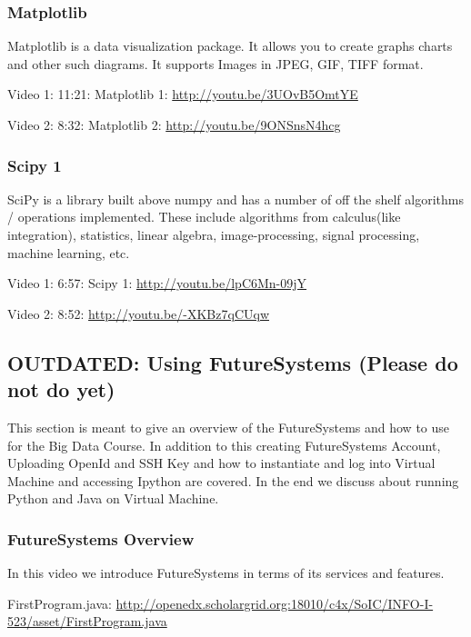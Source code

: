 \subsubsection{Matplotlib}\label{matplotlib}

Matplotlib is a data visualization package. It allows you to create
graphs charts and other such diagrams. It supports Images in JPEG, GIF,
TIFF format.

Video 1: 11:21: Matplotlib 1: \url{http://youtu.be/3UOvB5OmtYE}

Video 2: 8:32: Matplotlib 2: \url{http://youtu.be/9ONSnsN4hcg}

\subsubsection{Scipy 1}\label{scipy-1}

SciPy is a library built above numpy and has a number of off the shelf
algorithms / operations implemented. These include algorithms from
calculus(like integration), statistics, linear algebra,
image-processing, signal processing, machine learning, etc.

Video 1: 6:57: Scipy 1: \url{http://youtu.be/lpC6Mn-09jY}

Video 2: 8:52: \url{http://youtu.be/-XKBz7qCUqw}

\subsection{OUTDATED: Using FutureSystems (Please do not do
yet)}\label{outdated-using-futuresystems-please-do-not-do-yet}

This section is meant to give an overview of the FutureSystems and how
to use for the Big Data Course. In addition to this creating
FutureSystems Account, Uploading OpenId and SSH Key and how to
instantiate and log into Virtual Machine and accessing Ipython are
covered. In the end we discuss about running Python and Java on Virtual
Machine.

\subsubsection{FutureSystems Overview}\label{futuresystems-overview}

In this video we introduce FutureSystems in terms of its services and
features.

FirstProgram.java:
\url{http://openedx.scholargrid.org:18010/c4x/SoIC/INFO-I-523/asset/FirstProgram.java}

